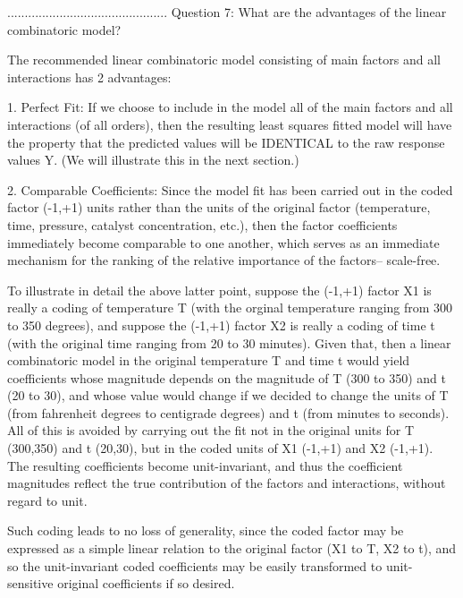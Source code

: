 ..............................................
Question 7: What are the advantages of the linear
            combinatoric model?

The recommended linear
combinatoric model consisting of main factors and all
interactions has 2 advantages:

   1. Perfect Fit:  If we choose to include in the
                    model all of the main factors
                    and all interactions (of all
                    orders), then the resulting
                    least squares fitted model
                    will have the property that
                    the predicted values will be
                    IDENTICAL to the raw response
                    values Y. (We will illustrate
                    this in the next section.)

   2. Comparable Coefficients:  Since the model fit has
                    been carried out in the coded
                    factor (-1,+1) units rather
                    than the units of the original
                    factor (temperature, time,
                    pressure, catalyst
                    concentration, etc.), then the
                    factor coefficients
                    immediately become comparable
                    to one another, which serves as
                    an immediate mechanism for the
                    ranking of the relative
                    importance of the factors--
                    scale-free.

To illustrate in detail the above latter point,
suppose the (-1,+1) factor X1 is really a coding
of temperature T (with the orginal temperature
ranging from 300 to 350 degrees), and suppose the
(-1,+1) factor X2 is really a coding of time t
(with the original time ranging from 20 to 30
minutes).  Given that, then a linear combinatoric
model in the original temperature T and time t
would yield coefficients whose magnitude depends
on the magnitude of T (300 to 350) and t (20 to
30), and whose value would change if we decided to
change the units of T (from fahrenheit degrees to
centigrade degrees) and t (from minutes to
seconds).  All of this is avoided by carrying out
the fit not in the original units for T (300,350)
and t (20,30), but in the coded units of X1
(-1,+1) and X2 (-1,+1).  The resulting
coefficients become unit-invariant, and thus the
coefficient magnitudes reflect the true
contribution of the factors and interactions,
without regard to unit.

Such coding leads to no loss of generality, since
the coded factor may be expressed as a simple
linear relation to the original factor (X1 to T,
X2 to t), and so the unit-invariant coded
coefficients may be easily transformed to
unit-sensitive original coefficients if so
desired.


